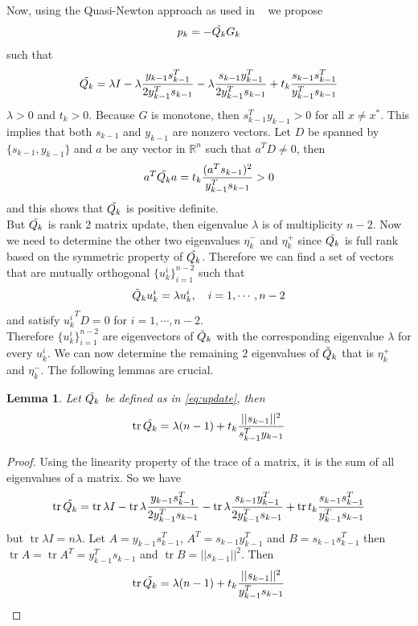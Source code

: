 \documentclass{article}
\newcommand{\R}{\mathbb{R}} %
\newtheorem{lemma}{Lemma}
\theoremstyle{remark}
\newcommand{\tr}{\operatorname{tr}}
\begin{document}
{Now, using the Quasi-Newton  approach as used in ~\cite{ perry1978modified, sabi2023modified} we propose 
\begin{equation}
  p_k=-\Tilde{Q_k}G_k  
\end{equation}
such that
\begin{equation}\label{eq:update}
  \Tilde{Q_k}=\lambda I-\lambda\frac{y_{k-1}s_{k-1}^T}{2y_{k-1}^Ts_{k-1}}-\lambda\frac{s_{k-1}y_{k-1}^T}{2y_{k-1}^Ts_{k-1}}+t_k\frac{s_{k-1}s_{k-1}^T}{y_{k-1}^Ts_{k-1}}  
\end{equation}
$\lambda>0$ and $t_k>0$. Because $G$ is monotone, then $s_{k-1}^Ty_{k-1}> 0$ for all $x \neq x^*$. This implies that both $s_{k-1}$ and $y_{k-1}$ are nonzero vectors. Let $D$ be spanned by $\{s_{k-1}, y_{k-1} \}$ and $a$ be any vector in $\R^n$ such that $a^TD\neq 0$, then 
\[
a^T\Tilde{Q_k}a=t_k\frac{(a^Ts_{k-1})^2}{y_{k-1}^Ts_{k-1}}>0
\]
and this shows that $\Tilde{Q_k}$ is positive definite.\\
But $\Tilde{Q_k}$ is rank 2 matrix update, then eigenvalue $\lambda$ is of multiplicity $n-2$.
Now we need to determine the other two eigenvalues $\eta_k^-$ and $\eta_k^+$ since $\Tilde{Q_k}$ is full rank based on the symmetric property of $\Tilde{Q_k}$. Therefore we can find a set of vectors that are mutually orthogonal $\{u_k^i\}_{i=1}^{n-2}$ such that \[
\Tilde{Q}_ku_k^i=\lambda u_k^i, ~~~i=1, \cdots, n-2
\] 
and satisfy ${u_k^i}^TD=0$ for $i=1, \cdots, n-2$.\\
Therefore $\{u_k^i\}_{i=1}^{n-2}$ are eigenvectors of $\Tilde{Q}_k$ with the corresponding eigenvalue $\lambda$ for every $u_k^i$. We can now determine the remaining $2$ eigenvalues of $\Tilde{Q}_k$ that is $\eta_k^+$ and $\eta_k^-$. The following lemmas are crucial.
\begin{lemma}
\label{A1}
    Let $\Tilde{Q_k}$ be defined as in \eqref{eq:update}, then \[
    \tr{\Tilde{Q_k}}=\lambda (n-1)+t_k\frac{||s_{k-1}||^2}{s_{k-1}^Ty_{k-1}}\] 
\end{lemma}
\begin{proof}
    Using the linearity property of the trace of a matrix, it is the sum of all eigenvalues of a matrix. So we have 
    \[
    \tr{\Tilde{Q_k}}=\tr{\lambda I}-\tr{\lambda\frac{y_{k-1}s_{k-1}^T}{2y_{k-1}^Ts_{k-1}}}-\tr{\lambda\frac{s_{k-1}y_{k-1}^T}{2y_{k-1}^Ts_{k-1}}}+\tr{t_k\frac{s_{k-1}s_{k-1}^T}{y_{k-1}^Ts_{k-1}}}
    \]
    but $\tr{\lambda I}=n\lambda$. Let $A=y_{k-1}s_{k-1}^T$, $A^T=s_{k-1}y_{k-1}^T$ and $B=s_{k-1}s_{k-1}^T$  then $\tr{A}=\tr{A^T}=y_{k-1}^Ts_{k-1}$ and $\tr{B}=||s_{k-1}||^2$. Then 
    \[
    \tr{\Tilde{Q_k}}=\lambda(n-1)+t_k\frac{||s_{k-1}||^2}{y_{k-1}^Ts_{k-1}}
    \]
\end{proof}

}
\end{document}
